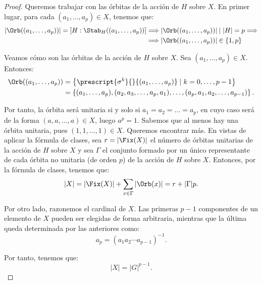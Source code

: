 \begin{ejercicio}
\begin{teo}[de Cauchy]
\begin{proof}
            Queremos trabajar con las órbitas de la acción de \(H\) sobre \(X\). En primer lugar, para cada \((a_1,\dots, a_p)\in X\), tenemos que:
            \begin{align*}
                |\Orb((a_1,\dots, a_p))| = [H: \Stab_H((a_1,\dots, a_p))]&\Longrightarrow
                |\Orb((a_1,\dots, a_p))| \mid |H|=p
                \Longrightarrow \\&\Longrightarrow
                |\Orb((a_1,\dots, a_p))| \in \{1, p\}
            \end{align*}


            Veamos cómo son las órbitas de la acción de \(H\) sobre \(X\). Sea \((a_1,\dots, a_p)\in X\). Entonces:
            \begin{align*}
                \Orb((a_1,\dots, a_p)) &= \left\{\prescript{\sigma^k}{}{(a_1,\dots, a_p)} \mid k = 0, \ldots, p-1\right\} \\
                &= \left\{(a_1,\dots, a_p), (a_2, a_3, \ldots, a_p, a_1), \ldots, (a_p, a_1, a_2, \ldots, a_{p-1})\right\}.
            \end{align*}

            Por tanto, la órbita será unitaria si y solo si $a_1 = a_2 = \ldots = a_p$, en cuyo caso será de la forma $(a, a, \ldots, a)\in X$, luego $a^p=1$. Sabemos que al menos hay una órbita unitaria, pues $(1, 1, \ldots, 1)\in X$. Queremos encontrar más. En vistas de aplicar la fórmula de clases, sea $r=|\Fix(X)|$ el número de órbitas unitarias de la acción de \(H\) sobre \(X\) y sea $\Gamma$ el conjunto formado por un único representante de cada órbita no unitaria (de orden $p$) de la acción de \(H\) sobre \(X\). Entonces, por la fórmula de clases, tenemos que:
            \begin{equation*}
                |X| = |\Fix(X)| + \sum_{x\in \Gamma}|\Orb(x)|
                = r + |\Gamma|p.
            \end{equation*}

            Por otro lado, razonemos el cardinal de $X$. Las primeras $p-1$ componentes de un elemento de \(X\) pueden ser elegidas de forma arbitraria, mientras que la última queda determinada por las anteriores como:
            \begin{equation*}
                a_p = (a_1 a_2\cdots a_{p-1})^{-1}.
            \end{equation*}

            Por tanto, tenemos que:
            \begin{equation*}
                |X| = |G|^{p-1}.
            \end{equation*}


\end{proof}
\end{teo}
\end{ejercicio}
